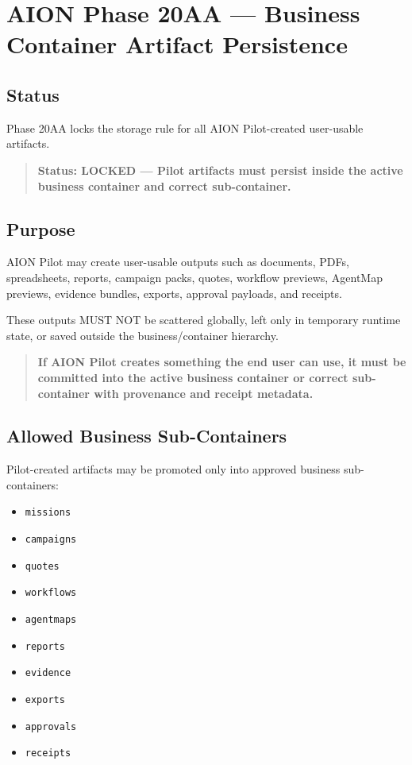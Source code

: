 \section{AION Phase 20AA --- Business Container Artifact Persistence}
\label{sec:aion-phase20aa-business-container-artifacts}

\subsection{Status}

Phase 20AA locks the storage rule for all AION Pilot-created user-usable artifacts.

\begin{quote}
\textbf{Status: LOCKED --- Pilot artifacts must persist inside the active business container and correct sub-container.}
\end{quote}

\subsection{Purpose}

AION Pilot may create user-usable outputs such as documents, PDFs, spreadsheets, reports, campaign packs, quotes, workflow previews, AgentMap previews, evidence bundles, exports, approval payloads, and receipts.

These outputs MUST NOT be scattered globally, left only in temporary runtime state, or saved outside the business/container hierarchy.

\begin{quote}
\textbf{If AION Pilot creates something the end user can use, it must be committed into the active business container or correct sub-container with provenance and receipt metadata.}
\end{quote}

\subsection{Allowed Business Sub-Containers}

Pilot-created artifacts may be promoted only into approved business sub-containers:

\begin{itemize}
  \item \texttt{missions}
  \item \texttt{campaigns}
  \item \texttt{quotes}
  \item \texttt{workflows}
  \item \texttt{agentmaps}
  \item \texttt{reports}
  \item \texttt{evidence}
  \item \texttt{exports}
  \item \texttt{approvals}
  \item \texttt{receipts}
\end{itemize}

